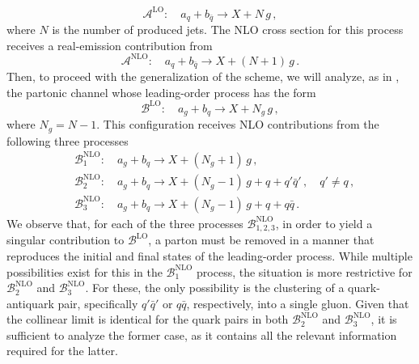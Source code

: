 \documentclass[a4paper, 12pt]{book}
\begin{document}
\begin{equation}
  \mathcal{A}^{\mathrm{LO}}: \quad a_q + b_{\bar{q}} \to X + N \, g \, ,
\end{equation}
where $N$ is the number of produced jets. The NLO cross section for this process receives a real-emission contribution from
\begin{equation}
  \mathcal{A}^{\mathrm{NLO}}: \quad a_q + b_{\bar{q}} \to X + (N+1) \, g \, .
\end{equation}
Then, to proceed with the generalization of the scheme, we will analyze, as in \cite{Devoto:2025kin}, the partonic channel whose leading-order process has the form
\begin{equation}
  \mathcal{B}^{\mathrm{LO}}: \quad a_g + b_q \to X + N_g \, g \, ,
\end{equation}
where $N_g=N-1$. This configuration receives NLO contributions from the following three processes
\begin{equation}
  \begin{aligned}
    &\mathcal{B}_1^{\mathrm{NLO}} : \quad a_g + b_q \to X + (N_g+1) \, g \, , \\
    & \mathcal{B}_2^{\mathrm{NLO}} : \quad a_g + b_q \to X + (N_g-1) \, g +q + q'\bar{q}'\, , \quad q' \neq q \, , \\
    & \mathcal{B}_3^{\mathrm{NLO}} : \quad a_g + b_q \to X + (N_g-1) \, g +q + q\bar{q}\,  .
  \end{aligned}
\end{equation}
We observe that, for each of the three processes $\mathcal{B}_{1,2,3}^{\mathrm{NLO}}$, in order to yield a singular contribution to $\mathcal{B}^{\mathrm{LO}}$, a parton must be removed in a manner that reproduces the initial and final states of the leading-order process. While multiple possibilities exist for this in the $\mathcal{B}_1^{\mathrm{NLO}}$ process, the situation is more restrictive for $\mathcal{B}_2^{\mathrm{NLO}}$ and $\mathcal{B}_3^{\mathrm{NLO}}$. For these, the only possibility is the clustering of a quark-antiquark pair, specifically $q'\bar{q}'$ or $q\bar{q}$, respectively, into a single gluon. Given that the collinear limit is identical for the quark pairs in both $\mathcal{B}_{2}^{\mathrm{NLO}}$ and $\mathcal{B}_{3}^{\mathrm{NLO}}$, it is sufficient to analyze the former case, as it contains all the relevant information required for the latter.
\end{document}
